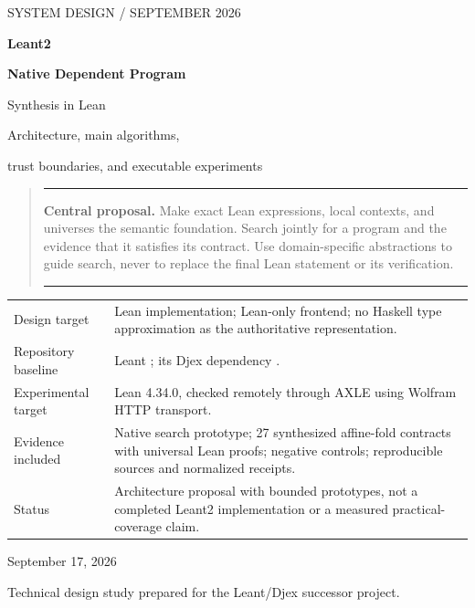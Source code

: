 \documentclass[11pt,letterpaper]{article}
\newcommand{\code}[1]{\texttt{\detokenize{#1}}}
\theoremstyle{definition}\newtheorem{definition}[theorem]{Definition}
\theoremstyle{remark}\newtheorem{remark}[theorem]{Remark}
\newenvironment{designbox}{\begin{quote}\small\color{ink}\hrule\vspace{5pt}}{\vspace{5pt}\hrule\end{quote}}
\begin{document}
\begin{titlepage}
\vspace*{0.5in}
{\color{accent}\large SYSTEM DESIGN / SEPTEMBER 2026\par}
\vspace{0.45in}
{\Huge\bfseries\color{ink} Leant2\par}
\vspace{0.18in}
{\LARGE\bfseries\color{ink} Native Dependent Program\par Synthesis in Lean\par}
\vspace{0.3in}
{\Large Architecture, main algorithms,\par trust boundaries, and executable experiments\par}
\vspace{0.65in}
\begin{designbox}
\textbf{Central proposal.} Make exact Lean expressions, local contexts, and universes the semantic foundation. Search jointly for a program and the evidence that it satisfies its contract. Use domain-specific abstractions to guide search, never to replace the final Lean statement or its verification.
\end{designbox}
\vspace{0.35in}
\begin{tabularx}{\textwidth}{@{}L{0.25\textwidth}Y@{}}
Design target & Lean implementation; Lean-only frontend; no Haskell type approximation as the authoritative representation.\\[8pt]
Repository baseline & Leant \code{6bf05ad78c46}; its Djex dependency \code{e237e8667190}.\\[8pt]
Experimental target & Lean 4.34.0, checked remotely through AXLE using Wolfram HTTP transport.\\[8pt]
Evidence included & Native search prototype; 27 synthesized affine-fold contracts with universal Lean proofs; negative controls; reproducible sources and normalized receipts.\\[8pt]
Status & Architecture proposal with bounded prototypes, not a completed Leant2 implementation or a measured practical-coverage claim.\\
\end{tabularx}
\vfill
{\large September 17, 2026\par}
{\small Technical design study prepared for the Leant/Djex successor project.\par}
\end{titlepage}
\end{document}
